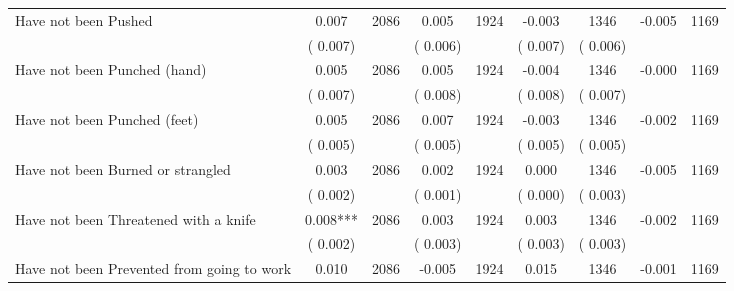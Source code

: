 \begin{tabular}{l*{8}{c}}
Have not been Pushed        &              0.007      &       2086       &              0.005      &       1924       &             -0.003      &       1346  &       -0.005 &       1169       \\
                       &       (       0.007)            &                               &       (       0.006)            &                               &       (       0.007)            &       (       0.006) &                  \\
Have not been Punched (hand)        &              0.005      &       2086       &              0.005      &       1924       &             -0.004      &       1346  &       -0.000 &       1169       \\
                       &       (       0.007)            &                               &       (       0.008)            &                               &       (       0.008)            &       (       0.007) &                  \\
Have not been Punched (feet)        &              0.005      &       2086       &              0.007      &       1924       &             -0.003      &       1346  &       -0.002 &       1169       \\
                       &       (       0.005)            &                               &       (       0.005)            &                               &       (       0.005)            &       (       0.005) &                  \\
Have not been Burned or strangled        &              0.003      &       2086       &              0.002      &       1924       &              0.000      &       1346  &       -0.005 &       1169       \\
                       &       (       0.002)            &                               &       (       0.001)            &                               &       (       0.000)            &       (       0.003) &                  \\
Have not been Threatened with a knife        &              0.008***      &       2086       &              0.003      &       1924       &              0.003      &       1346  &       -0.002 &       1169       \\
                       &       (       0.002)            &                               &       (       0.003)            &                               &       (       0.003)            &       (       0.003) &                  \\
Have not been Prevented from going to work        &              0.010      &       2086       &             -0.005      &       1924       &              0.015      &       1346  &       -0.001 &       1169       \\

\end{tabular}
